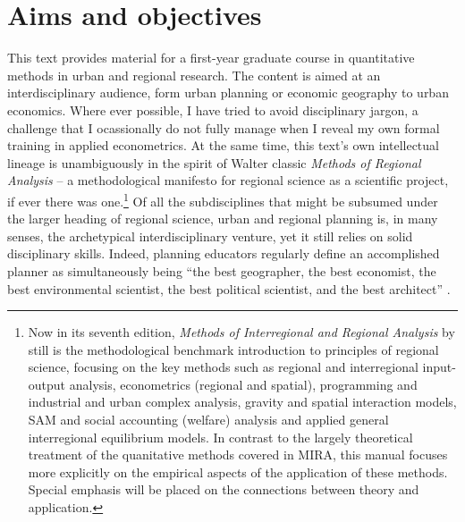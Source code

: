 \section{Aims and objectives}
This text provides material for a first-year graduate course in quantitative methods in urban and regional research. The content is aimed at an interdisciplinary audience, form urban planning or economic geography to urban economics. Where ever possible, I have tried to avoid disciplinary jargon, a challenge that I ocassionally do not fully manage when I reveal my own formal training in applied econometrics. At the same time, this text's own intellectual lineage is unambiguously in the spirit of Walter  classic \emph{Methods of Regional Analysis} -- a methodological manifesto for regional science as a scientific project, if ever there was one.\footnote{Now in its seventh edition, \emph{Methods of Interregional and Regional Analysis} by \citet[][MIRA hereafter]{Isard1998} still is the methodological benchmark introduction to principles of regional science, focusing on the key methods such as regional and interregional input-output analysis, econometrics (regional and spatial), programming and industrial and urban complex analysis, gravity and spatial interaction models, SAM and social accounting (welfare) analysis and applied general interregional equilibrium models. In contrast to the largely theoretical treatment of the quanitative methods covered in MIRA, this manual focuses more explicitly on the empirical aspects of the application of these methods. Special emphasis will be placed on the connections between theory and application.} Of all the subdisciplines that might be subsumed under the larger heading of regional science, urban and regional planning is, in many senses, the archetypical interdisciplinary venture, yet it still relies on solid disciplinary skills.  Indeed, planning educators regularly define an accomplished planner as simultaneously being ``the best geographer, the best economist, the best environmental scientist, the best political scientist, and the best architect'' \citep[][]{Fainstein2011}. 

